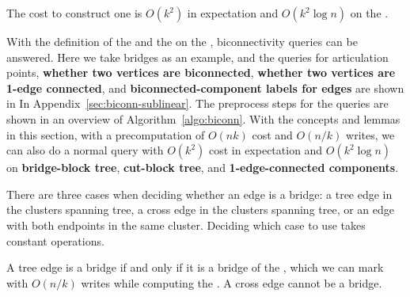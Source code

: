 \begin{lemma}\label{lem:locgraph-cons}
The cost to construct one \localgraph{} is $O(k^2)$ in expectation and $O(k^2\log n)$ \whp{} on the \seqmodel.
\end{lemma}

With the definition of the \localgraph{} and the \imprep{} on the \clustergraph, biconnectivity queries can be answered. Here we take bridges as an example, and the queries for articulation points, \textbf{whether two vertices are biconnected}, \textbf{whether two vertices are 1-edge connected}, and \textbf{biconnected-component labels for edges} are shown in In Appendix~\ref{sec:biconn-sublinear}.
The preprocess steps for the queries are shown in an overview of Algorithm~\ref{algo:biconn}.
With the concepts and lemmas in this section, with a precomputation of $O(nk)$ cost and $O(n/k)$ writes, we can also do a normal query with $O(k^2)$ cost in expectation and $O(k^2\log n)$ \whp{} on \textbf{bridge-block tree}, \textbf{cut-block tree}, and \textbf{1-edge-connected components}.

There are three cases when deciding whether an edge is a bridge: a tree edge in the clusters spanning tree, a cross edge in the clusters spanning tree, or an edge with both endpoints in the same cluster.
Deciding which case to use takes constant operations.

A tree edge is a bridge if and only if it is a bridge of the \clustergraph{}, which we can mark with $O(n/k)$ writes while computing the \imprep{}. A cross edge cannot be a bridge.

